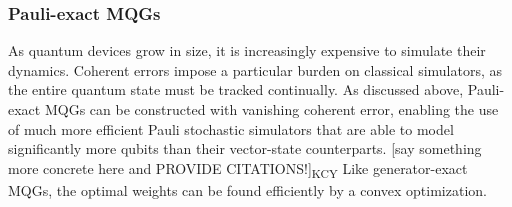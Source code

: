 \documentclass[aps,nofootinbib,pra,notitlepage,twocolumn]{revtex4-1}
\newcommand{\kcy}[1]{{\color{red}[#1]\textsubscript{\rm{KCY}}}}
\newcommand{\0}{\ensuremath{\mathbf{0}}}
\begin{document}




\subsubsection{Pauli-exact MQGs} %
\label{sub:off_diagonals}
As quantum devices grow in size, it is increasingly expensive to simulate their dynamics. Coherent errors impose a particular burden on classical simulators, as the entire quantum state must be tracked continually. As discussed above, Pauli-exact MQGs can be constructed with vanishing coherent error, enabling the use of much more efficient Pauli stochastic simulators that are able to model significantly more qubits than their vector-state counterparts. \kcy{say something more concrete here and PROVIDE CITATIONS!} Like generator-exact MQGs, the optimal weights can be found efficiently by a convex optimization. 
\end{document}
